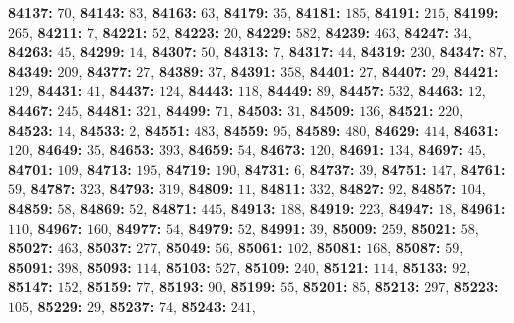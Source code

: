 \textsf{\bfseries 84137:} $70$, \textsf{\bfseries 84143:} $83$, \textsf{\bfseries 84163:} $63$, \textsf{\bfseries 84179:} $35$, \textsf{\bfseries 84181:} $185$, \textsf{\bfseries 84191:} $215$, \textsf{\bfseries 84199:} $265$, \textsf{\bfseries 84211:} $7$, \textsf{\bfseries 84221:} $52$, \textsf{\bfseries 84223:} $20$, \textsf{\bfseries 84229:} $582$, \textsf{\bfseries 84239:} $463$, \textsf{\bfseries 84247:} $34$, \textsf{\bfseries 84263:} $45$, \textsf{\bfseries 84299:} $14$, \textsf{\bfseries 84307:} $50$, \textsf{\bfseries 84313:} $7$, \textsf{\bfseries 84317:} $44$, \textsf{\bfseries 84319:} $230$, \textsf{\bfseries 84347:} $87$, \textsf{\bfseries 84349:} $209$, \textsf{\bfseries 84377:} $27$, \textsf{\bfseries 84389:} $37$, \textsf{\bfseries 84391:} $358$, \textsf{\bfseries 84401:} $27$, \textsf{\bfseries 84407:} $29$, \textsf{\bfseries 84421:} $129$, \textsf{\bfseries 84431:} $41$, \textsf{\bfseries 84437:} $124$, \textsf{\bfseries 84443:} $118$, \textsf{\bfseries 84449:} $89$, \textsf{\bfseries 84457:} $532$, \textsf{\bfseries 84463:} $12$, \textsf{\bfseries 84467:} $245$, \textsf{\bfseries 84481:} $321$, \textsf{\bfseries 84499:} $71$, \textsf{\bfseries 84503:} $31$, \textsf{\bfseries 84509:} $136$, \textsf{\bfseries 84521:} $220$, \textsf{\bfseries 84523:} $14$, \textsf{\bfseries 84533:} $2$, \textsf{\bfseries 84551:} $483$, \textsf{\bfseries 84559:} $95$, \textsf{\bfseries 84589:} $480$, \textsf{\bfseries 84629:} $414$, \textsf{\bfseries 84631:} $120$, \textsf{\bfseries 84649:} $35$, \textsf{\bfseries 84653:} $393$, \textsf{\bfseries 84659:} $54$, \textsf{\bfseries 84673:} $120$, \textsf{\bfseries 84691:} $134$, \textsf{\bfseries 84697:} $45$, \textsf{\bfseries 84701:} $109$, \textsf{\bfseries 84713:} $195$, \textsf{\bfseries 84719:} $190$, \textsf{\bfseries 84731:} $6$, \textsf{\bfseries 84737:} $39$, \textsf{\bfseries 84751:} $147$, \textsf{\bfseries 84761:} $59$, \textsf{\bfseries 84787:} $323$, \textsf{\bfseries 84793:} $319$, \textsf{\bfseries 84809:} $11$, \textsf{\bfseries 84811:} $332$, \textsf{\bfseries 84827:} $92$, \textsf{\bfseries 84857:} $104$, \textsf{\bfseries 84859:} $58$, \textsf{\bfseries 84869:} $52$, \textsf{\bfseries 84871:} $445$, \textsf{\bfseries 84913:} $188$, \textsf{\bfseries 84919:} $223$, \textsf{\bfseries 84947:} $18$, \textsf{\bfseries 84961:} $110$, \textsf{\bfseries 84967:} $160$, \textsf{\bfseries 84977:} $54$, \textsf{\bfseries 84979:} $52$, \textsf{\bfseries 84991:} $39$, \textsf{\bfseries 85009:} $259$, \textsf{\bfseries 85021:} $58$, \textsf{\bfseries 85027:} $463$, \textsf{\bfseries 85037:} $277$, \textsf{\bfseries 85049:} $56$, \textsf{\bfseries 85061:} $102$, \textsf{\bfseries 85081:} $168$, \textsf{\bfseries 85087:} $59$, \textsf{\bfseries 85091:} $398$, \textsf{\bfseries 85093:} $114$, \textsf{\bfseries 85103:} $527$, \textsf{\bfseries 85109:} $240$, \textsf{\bfseries 85121:} $114$, \textsf{\bfseries 85133:} $92$, \textsf{\bfseries 85147:} $152$, \textsf{\bfseries 85159:} $77$, \textsf{\bfseries 85193:} $90$, \textsf{\bfseries 85199:} $55$, \textsf{\bfseries 85201:} $85$, \textsf{\bfseries 85213:} $297$, \textsf{\bfseries 85223:} $105$, \textsf{\bfseries 85229:} $29$, \textsf{\bfseries 85237:} $74$, \textsf{\bfseries 85243:} $241$, 
